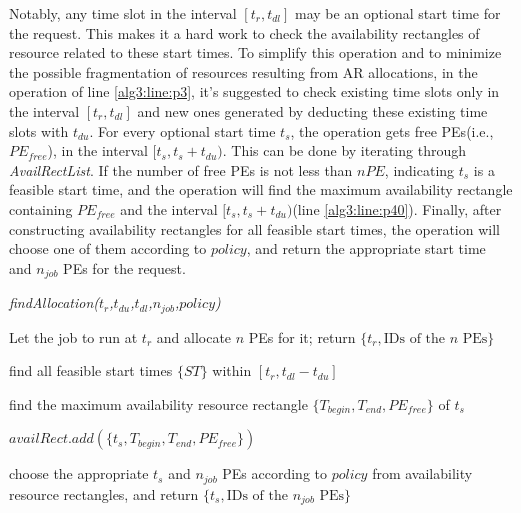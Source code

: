 \documentclass[preprint,12pt]{elsarticle}
\begin{document}
Notably, any time slot in the interval $[t_r, t_{dl}]$ may be an optional start time for the request. This makes it a hard work to check the availability rectangles of resource related to these start times. To simplify this operation and to minimize the possible fragmentation of resources resulting from AR allocations, in the operation of line \ref{alg3:line:p3}, it's suggested to check existing time slots only in the interval $[t_r, t_{dl}]$ and new ones generated by deducting these existing time slots with $t_{du}$. For every optional start time $t_s$, the operation gets free PEs(i.e., $PE_{free}$),  in the interval $[t_s, t_s+t_{du})$. This can be done by iterating through \emph{AvailRectList}. If the number of free PEs is not less than $nPE$, indicating $t_s$ is a feasible start time, and the operation will find the maximum availability rectangle containing $PE_{free}$ and the interval $[t_s, t_s+t_{du})$(line \ref{alg3:line:p40}). Finally, after constructing availability rectangles for all feasible start times, the operation will choose one of them according to $policy$, and return the appropriate start time and $n_{job}$ PEs for the request.


\begin{algorithm}[htbp]
\caption{\em{findAllocation}($t_r$,$t_{du}$,$t_{dl}$,$n_{job}$,$policy$)}
\label{alg:findResources}

    {
    Let the job to run at $t_r$ and allocate $n$ PEs for it;\;\label{alg3:line:p1}
    return $\{t_r,\textrm{IDs of the $n$ PEs}\}$\;\label{alg3:line:p2}
    }{
    find all feasible start times $\{ST\}$ within $[t_r, t_{dl}-t_{du}]$\;\label{alg3:line:p3}

        {\label{alg3:line:p31}

        find the maximum availability resource rectangle $\{T_{begin},T_{end},PE_{free}\}$ of $t_s$\;\label{alg3:line:p40}

        $availRect.add(\{t_s,T_{begin},T_{end},PE_{free}\})$\;}

    \label{alg3:line:p4}



    {
    choose the appropriate $t_s$ and $n_{job}$ PEs according to $policy$ from availability resource rectangles, and return $\{t_s,\textrm{IDs of the $n_{job}$ PEs}\}$\;\label{alg3:line:p5}
    }
    \label{alg3:line:p6}
    }

\end{algorithm}
\end{document}
